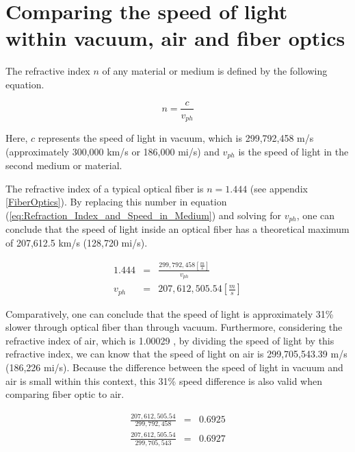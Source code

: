 \chapter{Comparing the speed of light within vacuum, air and fiber optics}
\label{LightSpeed_FiberOptics}

The refractive index $n$ of any material or medium is defined by the following equation.

\begin{equation}
    n = \frac{c}{v_{ph}}
    \label{eq:Refraction_Index_and_Speed_in_Medium}
\end{equation}

Here, $c$ represents the speed of light in vacuum, which is 299,792,458 m/s (approximately 300,000 km/s or 186,000 mi/s) \cite{Speed_of_Light:NIST} and $v_{ph}$ is the speed of light in the second medium or material. 

The refractive index of a typical optical fiber is $n = 1.444$ (see appendix \ref{FiberOptics}). By replacing this number in equation (\ref{eq:Refraction_Index_and_Speed_in_Medium}) and solving for $v_{ph}$, one can conclude that the speed of light inside an optical fiber has a theoretical maximum of 207,612.5 km/s (128,720 mi/s).

\begin{eqnarray}
    1.444 &=& \frac{299,792,458\left[\frac{m}{s}\right]}{v_{ph}} \\
    v_{ph} &=& 207,612,505.54 \left[\frac{m}{s}\right]
    \label{eq:Speed_of_Light_in_Fiber_Optics}
\end{eqnarray}

Comparatively, one can conclude that the speed of light is approximately 31\% slower through optical fiber than through vacuum. Furthermore, considering the refractive index of air, which is 1.00029 \cite{Hecht:Refractive_Index}, by dividing the speed of light by this refractive index, we can know that the speed of light on air is 299,705,543.39 m/s (186,226 mi/s). Because the difference between the speed of light in vacuum and air is small within this context, this 31\% speed difference is also valid when comparing fiber optic to air.

\begin{eqnarray}
    \frac{207,612,505.54}{299,792,458} &=&  0.6925 \nonumber\\
    \frac{207,612,505.54}{299,705,543} &=& 0.6927 \nonumber
\end{eqnarray}
